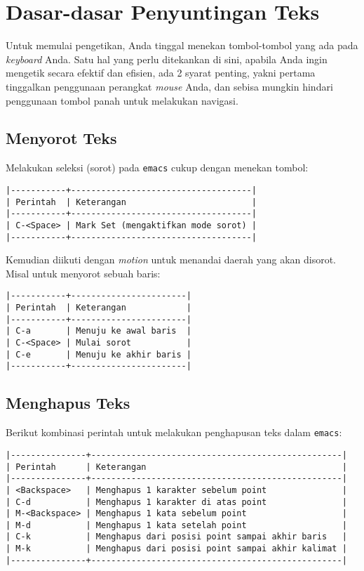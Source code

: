 \documentclass{article}
\begin{document}
\section{Dasar-dasar Penyuntingan Teks}

Untuk memulai pengetikan, Anda tinggal menekan tombol-tombol yang ada pada
\emph{keyboard} Anda. Satu hal yang perlu ditekankan di sini, apabila Anda 
ingin mengetik secara efektif dan efisien, ada 2 syarat penting, yakni pertama 
tinggalkan penggunaan perangkat \emph{mouse} Anda, dan sebisa mungkin hindari 
penggunaan tombol panah untuk melakukan navigasi.

\subsection{Menyorot Teks}
Melakukan seleksi (sorot) pada \verb=emacs= cukup dengan menekan tombol:

\begin{verbatim}
|-----------+------------------------------------|
| Perintah  | Keterangan                         |
|-----------+------------------------------------|
| C-<Space> | Mark Set (mengaktifkan mode sorot) |
|-----------+------------------------------------|
\end{verbatim}

Kemudian diikuti dengan \emph{motion} untuk menandai daerah yang akan disorot.
Misal untuk menyorot sebuah baris:

\begin{verbatim}
|-----------+-----------------------|
| Perintah  | Keterangan            |
|-----------+-----------------------|
| C-a       | Menuju ke awal baris  |
| C-<Space> | Mulai sorot           |
| C-e       | Menuju ke akhir baris |
|-----------+-----------------------|
\end{verbatim}

\subsection{Menghapus Teks}

Berikut kombinasi perintah untuk melakukan penghapusan teks dalam \verb=emacs=:

\begin{verbatim}
|---------------+--------------------------------------------------|
| Perintah      | Keterangan                                       |
|---------------+--------------------------------------------------|
| <Backspace>   | Menghapus 1 karakter sebelum point               |
| C-d           | Menghapus 1 karakter di atas point               |
| M-<Backspace> | Menghapus 1 kata sebelum point                   |
| M-d           | Menghapus 1 kata setelah point                   |
| C-k           | Menghapus dari posisi point sampai akhir baris   |
| M-k           | Menghapus dari posisi point sampai akhir kalimat |
|---------------+--------------------------------------------------|
\end{verbatim}
\end{document}
